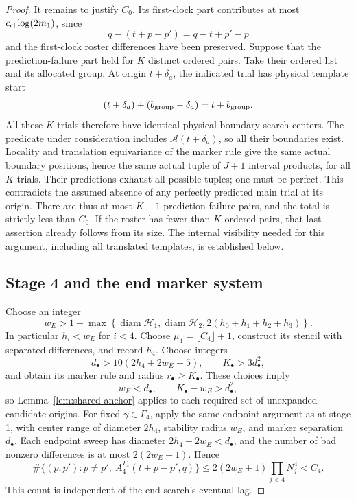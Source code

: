 \begin{proof}
It remains to justify \(C_0\).  Its first-clock part contributes at
most \(c_{\rm cl}\log(2m_1)\), since
\[
 q-(t+p-p')=q-t+p'-p
\]
and the first-clock roster differences have been preserved.
Suppose that the prediction-failure part held for \(K\) distinct
ordered pairs.  Take their ordered list and its allocated group.
At origin \(t+\delta_a\), the indicated trial has physical template
start
\[
 (t+\delta_a)+(b_{\rm group}-\delta_a)=t+b_{\rm group}.
\]
All these \(K\) trials therefore have identical physical boundary
search centers.  The predicate under consideration includes
\(\mathcal A(t+\delta_a)\), so all their boundaries exist.
Locality and translation equivariance of the marker rule give the
same actual boundary positions, hence the same actual tuple of
\(J+1\) interval products, for all \(K\) trials.  Their predictions
exhaust all possible tuples; one must be perfect.  This contradicts
the assumed absence of any perfectly predicted main trial at its
origin.  There are thus at most \(K-1\) prediction-failure pairs,
and the total is strictly less than \(C_0\).  If the roster has fewer
than \(K\) ordered pairs, that last assertion already follows from
its size.  The internal visibility needed for this argument, including
all translated templates, is established below.

\subsection*{Stage 4 and the end marker system}
Choose an integer
\begin{equation}\label{eq:parameter-we}
 w_E>1+\max\left\{
 \operatorname{diam}\mathcal H_1,
 \operatorname{diam}\mathcal H_2,
 2(h_0+h_1+h_2+h_3)\right\}.
\end{equation}
In particular \(h_i<w_E\) for \(i<4\).  Choose
\(\mu_4=\lfloor C_4\rfloor+1\), construct its stencil with separated
differences, and record \(h_4\).  Choose integers
\begin{equation}\label{eq:parameter-end-marker}
 d_\bullet>10(2h_4+2w_E+5),
 \qquad K_\bullet>3d_\bullet^2,
\end{equation}
and obtain its marker rule and radius \(r_\bullet\ge K_\bullet\).
These choices imply
\[
 w_E<d_\bullet,
 \qquad K_\bullet-w_E>d_\bullet^2,
\]
so Lemma~\ref{lem:shared-anchor} applies to each required set of
unexpanded candidate origins.
For fixed \(\gamma\in\Gamma_4\), apply the same endpoint argument as
at stage 1, with center range of diameter \(2h_4\), stability radius
\(w_E\), and marker separation \(d_\bullet\).  Each endpoint sweep
has diameter \(2h_4+2w_E<d_\bullet\), and the number of bad
nonzero differences is at most \(2(2w_E+1)\).  Hence
\[
 \#\{(p,p'):p\ne p',\ A_4^{\Gamma_4}(t+p-p',q)\}
 \le2(2w_E+1)\prod_{j<4}N_j^4<C_4.
\]
This count is independent of the end search's eventual lag.


\end{proof}
